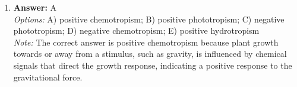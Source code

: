 \documentclass[12pt]{article}
\begin{document}
\begin{enumerate}[label=\arabic*.]
\\ \textit{Options:} A) Coevolution; B) Punctuated equilibrium; C) Directional selection; D) Divergent evolution; E) Convergent evolution
\\ \textit{Note:} Divergent evolution occurs when two related species evolve different traits or behaviors, often due to adapting to different environments or ecological niches, leading to a reduction in their similarities.
\item \textbf{Answer:} A
\\ \textit{Options:} A) positive chemotropism; B) positive phototropism; C) negative phototropism; D) negative chemotropism; E) positive hydrotropism
\\ \textit{Note:} The correct answer is positive chemotropism because plant growth towards or away from a stimulus, such as gravity, is influenced by chemical signals that direct the growth response, indicating a positive response to the gravitational force.
\end{enumerate}
\end{document}
